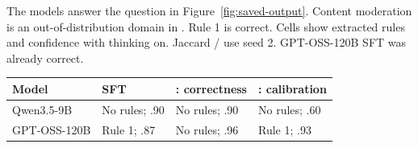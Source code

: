 \par\smallskip{} The models answer the question in Figure~\ref{fig:saved-output}. Content moderation is an out-of-distribution domain in \DB{}. Rule 1 is correct. Cells show extracted rules and confidence with thinking on. Jaccard \armA{}/\armB{} use seed 2. GPT-OSS-120B SFT was already correct.
\par{\fontsize{8.5}{9.6}\selectfont\setlength{\tabcolsep}{4pt}\begin{tabularx}{\linewidth}{@{}Xlll@{}}\toprule
Model & SFT & \armA{}: correctness & \armB{}: calibration\\\midrule
\rowcolor{blue!4}Qwen3.5-9B & No rules; .90 & No rules; .90 & \cellcolor{teal!12}No rules; .60\\
\rowcolor{orange!6}GPT-OSS-120B & Rule 1; .87 & No rules; .96 & \cellcolor{teal!12}Rule 1; .93\\\bottomrule
\end{tabularx}}\par
